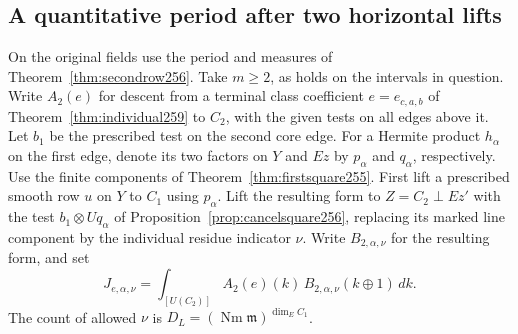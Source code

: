 \documentclass[a4paper,11pt]{article}
\theoremstyle{definition}
\theoremstyle{remark}
\numberwithin{equation}{section}
\begin{document}
\subsection{A quantitative period after two horizontal lifts}\label{nav:I-55}
On the original fields use the period and measures of
Theorem~\ref{thm:secondrow256}. Take \(m\ge2\), as holds on
the intervals in question. Write \(A_2(e)\) for descent from a
terminal class coefficient \(e=e_{c,a,b}\) of
Theorem~\ref{thm:individual259} to \(C_2\), with the given
tests on all edges above it. Let \(b_1\) be the prescribed
test on the second core edge. For a Hermite product \(h_\alpha\)
on the first edge, denote its two factors on \(Y\) and \(Ez\)
by \(p_\alpha\) and \(q_\alpha\), respectively. Use the
finite components of Theorem~\ref{thm:firstsquare255}.
First lift a prescribed smooth row \(u\) on \(Y\) to \(C_1\)
using \(p_\alpha\). Lift the resulting form to \(Z=C_2\perp Ez'\)
with the test \(b_1\otimes Uq_\alpha\) of
Proposition~\ref{prop:cancelsquare256}, replacing its marked
line component by the individual residue indicator \(\nu\).
Write \(B_{2,\alpha,\nu}\) for the resulting form, and set
\[
 J_{e,\alpha,\nu}=
      \int_{[U(C_2)]} A_2(e)(k)\,B_{2,\alpha,\nu}(k\oplus1)\,dk .
\]
The count of allowed \(\nu\) is
\(D_L=(\operatorname{Nm}\mathfrak m)^{\dim_E C_1}\).
\end{document}
